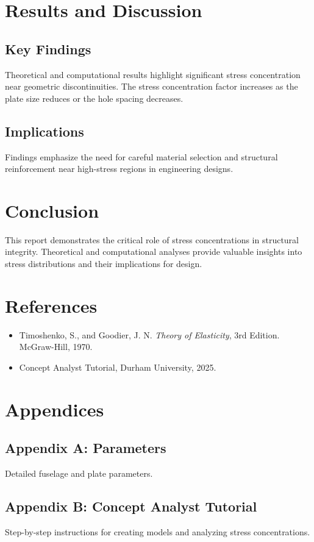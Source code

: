 \documentclass[a4paper,11pt]{article}
\begin{document}
\section{Results and Discussion}
\subsection{Key Findings}
Theoretical and computational results highlight significant stress concentration near geometric discontinuities. The stress concentration factor increases as the plate size reduces or the hole spacing decreases.

\subsection{Implications}
Findings emphasize the need for careful material selection and structural reinforcement near high-stress regions in engineering designs.

\section{Conclusion}
This report demonstrates the critical role of stress concentrations in structural integrity. Theoretical and computational analyses provide valuable insights into stress distributions and their implications for design.

\newpage
\section*{References}
\begin{itemize}
    \item Timoshenko, S., and Goodier, J. N. \textit{Theory of Elasticity}, 3rd Edition. McGraw-Hill, 1970.
    \item Concept Analyst Tutorial, Durham University, 2025.
\end{itemize}

\section*{Appendices}
\subsection*{Appendix A: Parameters}
Detailed fuselage and plate parameters.

\subsection*{Appendix B: Concept Analyst Tutorial}
Step-by-step instructions for creating models and analyzing stress concentrations.
\end{document}
